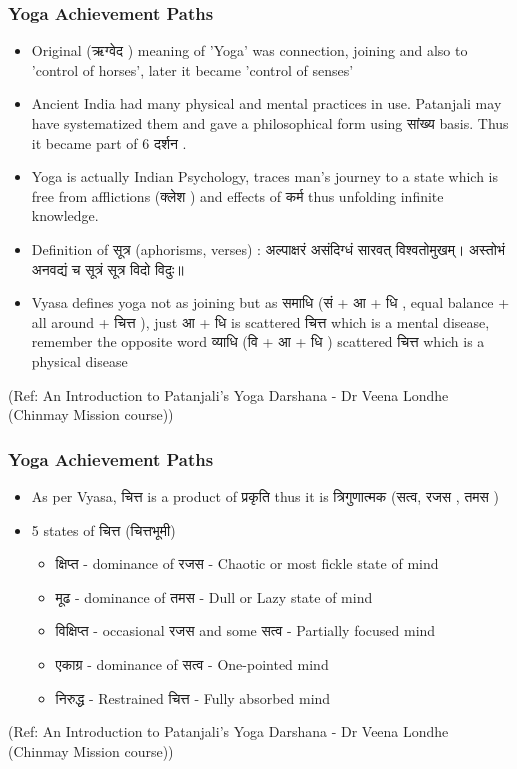 \begin{frame}[fragile]\frametitle{Yoga Achievement Paths}

\begin{itemize}
\item Original (ऋग्वेद ) meaning of 'Yoga' was connection, joining and also to 'control of horses', later it became 'control of senses'
\item Ancient India had many physical and mental practices in use. Patanjali may have systematized them and gave a philosophical form using सांख्य  basis. Thus it became part of 6 दर्शन .
\item Yoga is actually Indian Psychology, traces man's journey to a state which is free from afflictions (क्लेश ) and effects of कर्म  thus unfolding infinite knowledge.
\item Definition of सूत्र (aphorisms, verses) : अल्पाक्षरं असंदिग्धं सारवत्‌ विश्वतोमुखम्‌। अस्तोभं अनवद्यं च सूत्रं सूत्र विदो विदुः॥
\item Vyasa defines yoga not as joining but as समाधि  (सं + आ  + धि ,  equal balance + all around +  चित्त ), just आ  + धि is scattered चित्त which is a mental disease, remember the opposite word व्याधि (वि + आ + धि ) scattered चित्त which is a physical disease
\end{itemize}
  
  \tiny{(Ref: An Introduction to Patanjali’s Yoga Darshana - Dr Veena Londhe (Chinmay Mission course))}

\end{frame}

\begin{frame}[fragile]\frametitle{Yoga Achievement Paths}

\begin{itemize}
\item As per Vyasa, चित्त is a product of प्रकृति  thus it is त्रिगुणात्मक (सत्व, रजस , तमस )
\item 5 states of चित्त (चित्तभूमी)
	\begin{itemize}
	\item क्षिप्त  - dominance of  रजस - Chaotic or most fickle state of mind
	\item मूढ  - dominance of  तमस - Dull or Lazy state of mind
	\item विक्षिप्त  - occasional रजस and some सत्व - Partially focused mind
	\item एकाग्र   - dominance of  सत्व - One-pointed mind
	\item निरुद्ध  - Restrained  चित्त - Fully absorbed mind
	\end{itemize}
\end{itemize}
  
  \tiny{(Ref: An Introduction to Patanjali’s Yoga Darshana - Dr Veena Londhe (Chinmay Mission course))}

\end{frame}


